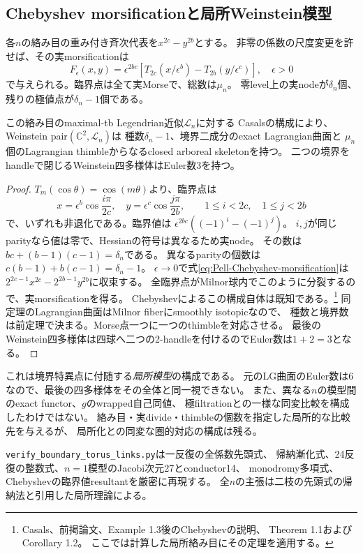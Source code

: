 \subsection{Chebyshev morsificationと局所Weinstein模型}
\begin{proposition}
\label{prop:Pell-Chebyshev-Weinstein}
各$n$の絡み目の重み付き斉次代表を$x^{2c}-y^{2b}$とする。
非零の係数の尺度変更を許せば、その実morsificationは
\begin{equation}\label{eq:Pell-Chebyshev-morsification}
 F_\epsilon(x,y)=\epsilon^{2bc}
 \left[T_{2c}(x/\epsilon^b)-T_{2b}(y/\epsilon^c)\right],\quad \epsilon>0
\end{equation}
で与えられる。臨界点は全て実Morseで、総数は$\mu_n$。
零level上の実nodeが$\delta_n$個、残りの極値点が$\delta_n-1$個である。

この絡み目のmaximal-tb Legendrian近似$\mathcal L_n$に対する
Casalsの構成により、Weinstein pair$(\mathbb C^2,\mathcal L_n)$は
種数$\delta_n-1$、境界二成分のexact Lagrangian曲面と
$\mu_n$個のLagrangian thimbleからなるclosed arboreal skeletonを持つ。
二つの境界をhandleで閉じるWeinstein四多様体はEuler数$3$を持つ。
\end{proposition}
\begin{proof}
$T_m(\cos\theta)=\cos(m\theta)$より、臨界点は
\[
 x=\epsilon^b\cos\frac{i\pi}{2c},\quad
 y=\epsilon^c\cos\frac{j\pi}{2b},\qquad
 1\le i<2c,\quad1\le j<2b
\]
で、いずれも非退化である。臨界値は
$\epsilon^{2bc}((-1)^i-(-1)^j)$。
$i,j$が同じparityなら値は零で、Hessianの符号は異なるため実node。
その数は$bc+(b-1)(c-1)=\delta_n$である。
異なるparityの個数は$c(b-1)+b(c-1)=\delta_n-1$。
$\epsilon\to0$で式\eqref{eq:Pell-Chebyshev-morsification}は
$2^{2c-1}x^{2c}-2^{2b-1}y^{2b}$に収束する。
全臨界点がMilnor球内でこのように分裂するので、実morsificationを得る。
Chebyshevによるこの構成自体は既知である。\footnote{
Casals、前掲論文、Example 1.3後のChebyshevの説明、
Theorem 1.1およびCorollary 1.2。
ここでは計算した局所絡み目にその定理を適用する。}
同定理のLagrangian曲面はMilnor fiberにsmoothly isotopicなので、
種数と境界数は前定理で決まる。Morse点一つに一つのthimbleを対応させる。
最後のWeinstein四多様体は四球へ二つの2-handleを付けるのでEuler数は$1+2=3$となる。
\end{proof}

これは境界特異点に付随する\emph{局所模型}の構成である。
元のLG曲面のEuler数は$6$なので、最後の四多様体をその全体と同一視できない。
また、異なる$n$の模型間のexact functor、$g$のwrapped自己同値、
極filtrationとの一様な同変比較を構成したわけではない。
絡み目・実divide・thimbleの個数を指定した局所的な比較先を与えるが、
局所化との同変な圏的対応の構成は残る。

\begin{remark}[再現計算]
\texttt{verify\_boundary\_torus\_links.py}は一反復の全係数先頭式、
帰納漸化式、24反復の整数式、$n=1$模型のJacobi次元27とconductor14、
monodromy多項式、Chebyshevの臨界値resultantを厳密に再現する。
全$n$の主張は二枝の先頭式の帰納法と引用した局所理論による。
\end{remark}
